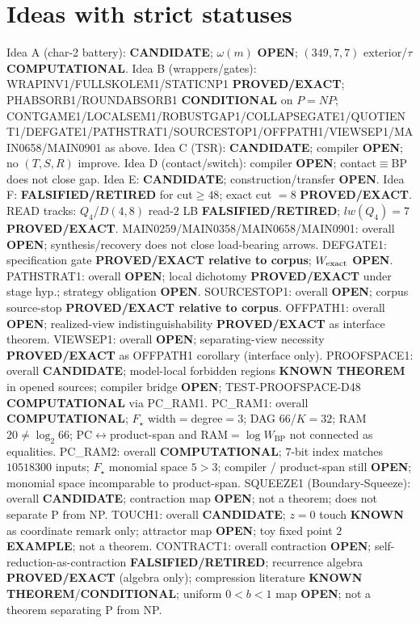 \documentclass[11pt]{article}
\begin{document}
\section*{Ideas with strict statuses}
Idea A (char-2 battery): \textbf{CANDIDATE}; $\omega(m)$ \textbf{OPEN}; $(349,7,7)$ exterior/$\tau$ \textbf{COMPUTATIONAL}.
Idea B (wrappers/gates): WRAPINV1/FULLSKOLEM1/STATICNP1 \textbf{PROVED/EXACT};
PHABSORB1/ROUNDABSORB1 \textbf{CONDITIONAL} on $P=NP$;
CONTGAME1/LOCALSEM1/ROBUSTGAP1/COLLAPSEGATE1/QUOTIENT1/DEFGATE1/PATHSTRAT1/SOURCESTOP1/OFFPATH1/VIEWSEP1/MAIN0658/MAIN0901 as above.
Idea C (TSR): \textbf{CANDIDATE}; compiler \textbf{OPEN}; no $(T,S,R)$ improve.
Idea D (contact/switch): compiler \textbf{OPEN}; contact$\equiv$BP does not close gap.
Idea E: \textbf{CANDIDATE}; construction/transfer \textbf{OPEN}.
Idea F: \textbf{FALSIFIED/RETIRED} for cut$\ge48$; exact cut $=8$ \textbf{PROVED/EXACT}.
READ tracks: $Q_4$/$D(4,8)$ read-$2$ LB \textbf{FALSIFIED/RETIRED}; $lw(Q_4)=7$ \textbf{PROVED/EXACT}.
MAIN0259/MAIN0358/MAIN0658/MAIN0901: overall \textbf{OPEN}; synthesis/recovery does not close load-bearing arrows.
DEFGATE1: specification gate \textbf{PROVED/EXACT relative to corpus}; $W_{\rm exact}$ \textbf{OPEN}.
PATHSTRAT1: overall \textbf{OPEN}; local dichotomy \textbf{PROVED/EXACT} under stage hyp.; strategy obligation \textbf{OPEN}.
SOURCESTOP1: overall \textbf{OPEN}; corpus source-stop \textbf{PROVED/EXACT relative to corpus}.
OFFPATH1: overall \textbf{OPEN}; realized-view indistinguishability \textbf{PROVED/EXACT} as interface theorem.
VIEWSEP1: overall \textbf{OPEN}; separating-view necessity \textbf{PROVED/EXACT} as OFFPATH1 corollary (interface only).
PROOFSPACE1: overall \textbf{CANDIDATE}; model-local forbidden regions \textbf{KNOWN THEOREM} in opened sources;
compiler bridge \textbf{OPEN}; TEST-PROOFSPACE-D48 \textbf{COMPUTATIONAL} via PC\_RAM1.
PC\_RAM1: overall \textbf{COMPUTATIONAL}; $F_\star$ width$=$degree$=3$; DAG $66$/$K{=}32$; RAM $20\neq\log_2 66$;
PC$\leftrightarrow$product-span and RAM$=\log W_{\mathrm{BP}}$ not connected as equalities.
PC\_RAM2: overall \textbf{COMPUTATIONAL}; $7$-bit index matches $10518300$ inputs; $F_\star$ monomial space $5{\gt}3$;
compiler / product-span still \textbf{OPEN}; monomial space incomparable to product-span.
SQUEEZE1 (Boundary-Squeeze): overall \textbf{CANDIDATE}; contraction map \textbf{OPEN}; not a theorem;
does not separate P from NP.
TOUCH1: overall \textbf{CANDIDATE}; $z{=}0$ touch \textbf{KNOWN} as coordinate remark only; attractor map \textbf{OPEN}; toy fixed point $2$ \textbf{EXAMPLE}; not a theorem.
CONTRACT1: overall contraction \textbf{OPEN}; self-reduction-as-contraction \textbf{FALSIFIED/RETIRED};
recurrence algebra \textbf{PROVED/EXACT} (algebra only); compression literature \textbf{KNOWN THEOREM}/\textbf{CONDITIONAL};
uniform $0{<}b{<}1$ map \textbf{OPEN}; not a theorem separating P from NP.
\end{document}
